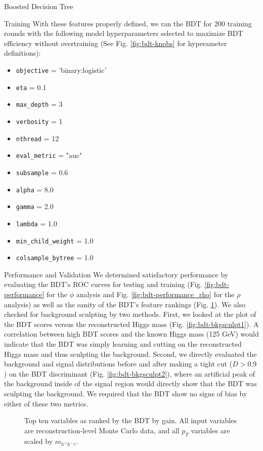 \begin{section}{Boosted Decision Tree}
\begin{subsection}{Training}
With these features properly defined, we ran the BDT for 200 training rounds with the following model hyperparameters selected to maximize BDT efficiency without overtraining (See Fig. \ref{fig:bdt-knobs} for hyperameter definitions):
\begin{itemize}
    \item \verb|objective| = 'binary:logistic'
    \item \verb|eta| = 0.1
    \item \verb|max_depth| = 3
    \item \verb|verbosity| = 1
    \item \verb|nthread| = 12
    \item \verb|eval_metric| = "auc"
    \item \verb|subsample| = 0.6
    \item \verb|alpha| = 8.0
    \item \verb|gamma| = 2.0
    \item \verb|lambda| = 1.0
    \item \verb|min_child_weight| = 1.0
    \item \verb|colsample_bytree| = 1.0
\end{itemize}

\end{subsection}
\begin{subsection}{Performance and Validation}\label{perf-and-val}
We determined satisfactory performance by evaluating the BDT's ROC curves for testing and training (Fig. \ref{fig:bdt-performance} for the $\phi$ analysis and Fig. \ref{fig:bdt-performance_rho} for the $\rho$ analysis) as well as the sanity of the BDT's feature rankings (Fig. \ref{fig:bdt-vars}). We also checked for background sculpting by two methods. First, we looked at the plot of the BDT scores versus the reconstructed Higgs mass (Fig. \ref{fig:bdt-bkgsculpt1}). A correlation between high BDT scores and the known Higgs mass (125 GeV) would indicate that the BDT was simply learning and cutting on the reconstructed Higgs mass and thus sculpting the background. Second, we directly evaluated the background and signal distributions before and after making a tight cut ($D > 0.9$) on the BDT discriminant (Fig. \ref{fig:bdt-bkgsculpt2}), where an artificial peak of the background inside of the signal region would directly show that the BDT was sculpting the background. We required that the BDT show no signs of bias by either of these two metrics.

\begin{figure}[htb]
\begin{center}
\subfloat      {
\scalebox{.75}[0.75]{}
}\quad
\subfloat      {
\scalebox{.75}[0.75]{}
}
\end{center}
\caption{Top ten variables as ranked by the BDT by gain. All input variables are reconstruction-level Monte Carlo data, and all $p_{T}$ variables are scaled by $m_{h^{+}h^{-}\gamma}.$}
\label{fig:bdt-vars}
\end{figure}


\end{subsection}
\end{section}
